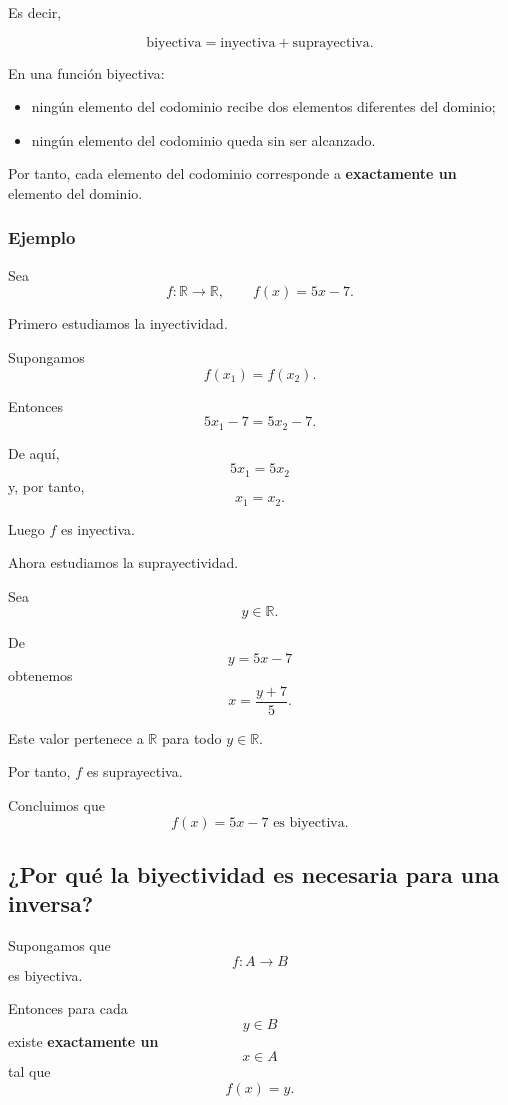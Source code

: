 \documentclass[12pt]{article}
\theoremstyle{remark}
\begin{document}
Es decir,

\[
\boxed{
\text{biyectiva}
=
\text{inyectiva}
+
\text{suprayectiva}.
}
\]

En una función biyectiva:

\begin{itemize}
    \item ningún elemento del codominio recibe dos elementos diferentes
    del dominio;
    \item ningún elemento del codominio queda sin ser alcanzado.
\end{itemize}

Por tanto, cada elemento del codominio corresponde a
\textbf{exactamente un} elemento del dominio.

\subsubsection{Ejemplo}

Sea
\[
f:\mathbb{R}\longrightarrow\mathbb{R},
\qquad
f(x)=5x-7.
\]

Primero estudiamos la inyectividad.

Supongamos
\[
f(x_1)=f(x_2).
\]

Entonces
\[
5x_1-7=5x_2-7.
\]

De aquí,
\[
5x_1=5x_2
\]
y, por tanto,
\[
x_1=x_2.
\]

Luego \(f\) es inyectiva.

Ahora estudiamos la suprayectividad.

Sea
\[
y\in\mathbb{R}.
\]

De
\[
y=5x-7
\]
obtenemos
\[
x=\frac{y+7}{5}.
\]

Este valor pertenece a \(\mathbb{R}\) para todo \(y\in\mathbb{R}\).

Por tanto, \(f\) es suprayectiva.

Concluimos que
\[
\boxed{f(x)=5x-7\text{ es biyectiva}.}
\]

\subsection{¿Por qué la biyectividad es necesaria para una inversa?}

Supongamos que
\[
f:A\longrightarrow B
\]
es biyectiva.

Entonces para cada
\[
y\in B
\]
existe \textbf{exactamente un}
\[
x\in A
\]
tal que
\[
f(x)=y.
\]
\end{document}
